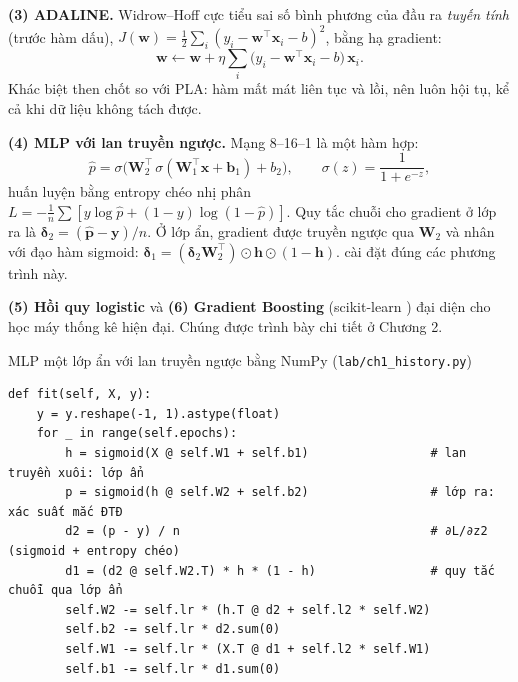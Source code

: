 \textbf{(3) ADALINE.} Widrow–Hoff cực tiểu sai số bình phương của đầu ra \emph{tuyến tính} (trước hàm dấu), $J(\mathbf w) = \tfrac12\sum_i (y_i - \mathbf w^\top\mathbf x_i - b)^2$, bằng hạ gradient:
\begin{equation}
\mathbf w \leftarrow \mathbf w + \eta \sum_i \big(y_i - \mathbf w^\top\mathbf x_i - b\big)\,\mathbf x_i .
\label{eq:adaline}
\end{equation}
Khác biệt then chốt so với PLA: hàm mất mát liên tục và lồi, nên luôn hội tụ, kể cả khi dữ liệu không tách được.

\textbf{(4) MLP với lan truyền ngược.} Mạng 8–16–1 là một hàm hợp:
\begin{equation}
\hat p = \sigma\!\big(\mathbf W_2^\top\, \sigma(\mathbf W_1^\top \mathbf x + \mathbf b_1) + b_2\big), \qquad \sigma(z) = \frac{1}{1+e^{-z}},
\label{eq:mlp1}
\end{equation}
huấn luyện bằng entropy chéo nhị phân $L=-\frac1n\sum[y\log\hat p+(1-y)\log(1-\hat p)]$. Quy tắc chuỗi cho gradient ở lớp ra là $\boldsymbol\delta_2 = (\hat{\mathbf p} - \mathbf y)/n$. Ở lớp ẩn, gradient được truyền ngược qua $\mathbf W_2$ và nhân với đạo hàm sigmoid: $\boldsymbol\delta_1 = (\boldsymbol\delta_2 \mathbf W_2^\top)\odot \mathbf h \odot (1-\mathbf h)$.  cài đặt đúng các phương trình này.

\textbf{(5) Hồi quy logistic} và \textbf{(6) Gradient Boosting} (scikit-learn \cite{pedregosa2011}) đại diện cho học máy thống kê hiện đại. Chúng được trình bày chi tiết ở Chương 2.

\begin{code}{MLP một lớp ẩn với lan truyền ngược bằng NumPy (\texttt{lab/ch1\_history.py})}
\label{lst:ch1-mlp}
\begin{verbatim}
def fit(self, X, y):
    y = y.reshape(-1, 1).astype(float)
    for _ in range(self.epochs):
        h = sigmoid(X @ self.W1 + self.b1)                 # lan truyền xuôi: lớp ẩn
        p = sigmoid(h @ self.W2 + self.b2)                 # lớp ra: xác suất mắc ĐTĐ
        d2 = (p - y) / n                                   # ∂L/∂z2 (sigmoid + entropy chéo)
        d1 = (d2 @ self.W2.T) * h * (1 - h)                # quy tắc chuỗi qua lớp ẩn
        self.W2 -= self.lr * (h.T @ d2 + self.l2 * self.W2)
        self.b2 -= self.lr * d2.sum(0)
        self.W1 -= self.lr * (X.T @ d1 + self.l2 * self.W1)
        self.b1 -= self.lr * d1.sum(0)
\end{verbatim}
\end{code}

